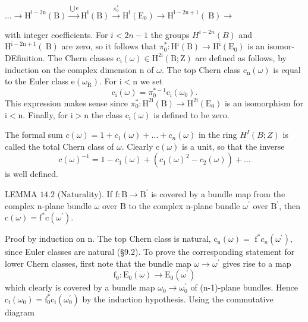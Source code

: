 \documentclass[10pt]{article}
\begin{document}
$\ldots \longrightarrow \mathrm{H}^{\mathrm{i}-2 \mathrm{n}}(\mathrm{B}) \stackrel{\bigcup \mathrm{e}}{\longrightarrow} \mathrm{H}^{\mathrm{i}}(\mathrm{B}) \stackrel{\pi_{0}^{*}}{\longrightarrow} \mathrm{H}^{\mathrm{i}}\left(\mathrm{E}_{0}\right) \longrightarrow \mathrm{H}^{\mathrm{i}-2 \mathrm{n}+1}(\mathrm{~B}) \longrightarrow$

with integer coefficients. For $i<2 n-1$ the groups $H^{i-2 n}(B)$ and $\mathrm{H}^{\mathrm{i}-2 \mathrm{n}+1}(\mathrm{~B})$ are zero, so it follows that $\pi_{0}^{*}: \mathrm{H}^{\mathrm{i}}(\mathrm{B}) \rightarrow \mathrm{H}^{\mathrm{i}}\left(\mathrm{E}_{0}\right)$ is an isomor- DEfinition. The Chern classes $\mathrm{c}_{\mathrm{i}}(\omega) \in \mathrm{H}^{2 \mathrm{i}}(\mathrm{B} ; \mathrm{Z})$ are defined as follows, by induction on the complex dimension $\mathrm{n}$ of $\omega$. The top Chern class $\mathrm{c}_{\mathrm{n}}(\omega)$ is equal to the Euler class $\mathrm{e}\left(\omega_{\mathrm{R}}\right)$. For $\mathrm{i}<\mathrm{n}$ we set
$$
\mathrm{c}_{\mathrm{i}}(\omega)=\pi_{0}^{*-1} \mathrm{c}_{\mathrm{i}}\left(\omega_{0}\right) .
$$
This expression makes sense since $\pi_{0}^{*}: \mathrm{H}^{2 \mathrm{i}}(\mathrm{B}) \rightarrow \mathrm{H}^{2 \mathrm{i}}\left(\mathrm{E}_{0}\right)$ is an isomorphism for $\mathrm{i}<\mathrm{n}$. Finally, for $\mathrm{i}>\mathrm{n}$ the class $\mathrm{c}_{\mathrm{i}}(\omega)$ is defined to be zero.

The formal sum $c(\omega)=1+c_{1}(\omega)+\ldots+c_{n}(\omega)$ in the ring $H^{I}(B ; Z)$ is called the total Chern class of $\omega$. Clearly $\mathrm{c}(\omega)$ is a unit, so that the inverse
$$
c(\omega)^{-1}=1-c_{1}(\omega)+\left(c_{1}(\omega)^{2}-c_{2}(\omega)\right)+\ldots
$$
is well defined.

LEMMA $14.2$ (Naturality). If $\mathrm{f}: \mathrm{B} \rightarrow \mathrm{B}^{\prime}$ is covered by a bundle map from the complex $\mathrm{n}$-plane bundle $\omega$ over $\mathrm{B}$ to the complex $\mathrm{n}$-plane bundle $\omega^{\prime}$ over $\mathrm{B}^{\prime}$, then $\mathrm{c}(\omega)=\mathrm{f}^{*} \mathrm{c}\left(\omega^{\prime}\right)$.

Proof by induction on $\mathrm{n}$. The top Chern class is natural, $\mathrm{c}_{\mathrm{n}}(\omega)=$ $\mathrm{f}^{*} c_{n}\left(\omega^{\prime}\right)$, since Euler classes are natural (§9.2). To prove the corresponding statement for lower Chern classes, first note that the bundle map $\omega \rightarrow \omega^{\prime}$ gives rise to a map
$$
\mathrm{f}_{0}: \mathrm{E}_{0}(\omega) \rightarrow \mathrm{E}_{0}\left(\omega^{\prime}\right)
$$
which clearly is covered by a bundle map $\omega_{0} \rightarrow \omega_{0}^{\prime}$ of (n-1)-plane bundles. Hence $\mathrm{c}_{\mathrm{i}}\left(\omega_{0}\right)=\mathrm{f}_{0}^{*} \mathrm{c}_{\mathrm{i}}\left(\omega_{0}^{\prime}\right)$ by the induction hypothesis. Using the commutative diagram
\end{document}
